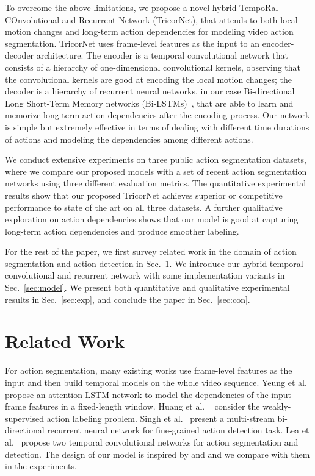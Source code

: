 \documentclass{article}
\begin{document}
To overcome the above limitations, we propose a novel hybrid TempoRal COnvolutional and Recurrent Network (TricorNet), that attends to both local motion changes and long-term action dependencies for modeling video action segmentation. TricorNet uses frame-level features as the input to an encoder-decoder architecture. The encoder is a temporal convolutional network that consists of a hierarchy of one-dimensional convolutional kernels, observing that the convolutional kernels are good at encoding the local motion changes; the decoder is a hierarchy of recurrent neural networks, in our case Bi-directional Long Short-Term Memory networks (Bi-LSTMs)~\cite{graves2005bidirectional}, that are able to learn and memorize long-term action dependencies after the encoding process. Our network is simple but extremely effective in terms of dealing with different time durations of actions and modeling the dependencies among different actions. 

We conduct extensive experiments on three public action segmentation datasets, where we compare our proposed models with a set of recent action segmentation networks using three different evaluation metrics. The quantitative experimental results show that our proposed TricorNet achieves superior or competitive performance to state of the art on all three datasets. A further qualitative exploration on action dependencies shows that our model is good at capturing long-term action dependencies and produce smoother labeling. 

For the rest of the paper, we first survey related work in the domain of action segmentation and action detection in Sec.~\ref{sec:related}. We introduce our hybrid temporal convolutional and recurrent network with some implementation variants in Sec.~\ref{sec:model}. We present both quantitative and qualitative experimental results in Sec.~\ref{sec:exp}, and conclude the paper in Sec.~\ref{sec:con}. 

\section{Related Work}
\label{sec:related}

For action segmentation, many existing works use frame-level features as the input and then build temporal models on the whole video sequence. Yeung et al.~\cite{YeRuJiARXIV2015} propose an attention LSTM network to model the dependencies of the input frame features in a fixed-length window. Huang et al. ~\cite{HuFeNiECCV2016} consider the weakly-supervised action labeling problem. Singh et al.~\cite{SiMaJoCVPR2016} present a multi-stream bi-directional recurrent neural network for fine-grained action detection task. Lea et al.~\cite{LeFlViCVPR2017} propose two temporal convolutional networks for action segmentation and detection. The design of our model is inspired by \cite{SiMaJoCVPR2016} and \cite{LeFlViCVPR2017} and we compare with them in the experiments. 
\end{document}
